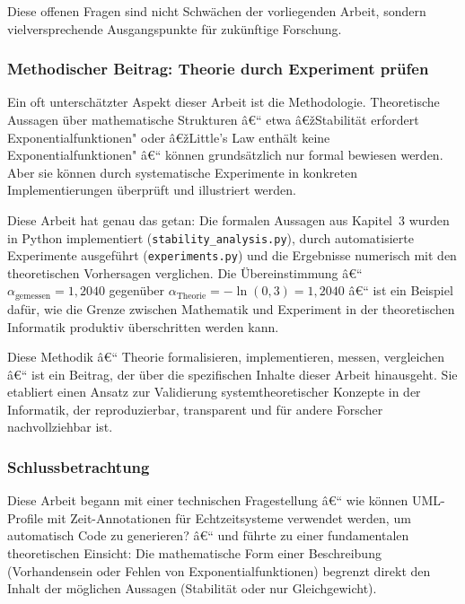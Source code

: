 ﻿\documentclass[a4paper,12pt]{scrreprt}
\theoremstyle{definition}
\begin{document}
Diese offenen Fragen sind nicht Schwächen der vorliegenden Arbeit, sondern
vielversprechende Ausgangspunkte für zukünftige Forschung.

\subsubsection{Methodischer Beitrag: Theorie durch Experiment prüfen}

Ein oft unterschätzter Aspekt dieser Arbeit ist die Methodologie.
Theoretische Aussagen über mathematische Strukturen â€“ etwa â€žStabilität
erfordert Exponentialfunktionen" oder â€žLittle's Law enthält keine
Exponentialfunktionen" â€“ können grundsätzlich nur formal bewiesen werden.
Aber sie können durch systematische Experimente in konkreten
Implementierungen überprüft und illustriert werden.

Diese Arbeit hat genau das getan: Die formalen Aussagen aus Kapitel~3 wurden
in Python implementiert (\texttt{stability\_analysis.py}), durch automatisierte
Experimente ausgeführt (\texttt{experiments.py}) und die Ergebnisse numerisch
mit den theoretischen Vorhersagen verglichen.  Die Übereinstimmung â€“
$\alpha_\text{gemessen} = 1{,}2040$ gegenüber $\alpha_\text{Theorie} =
-\ln(0{,}3) = 1{,}2040$ â€“ ist ein Beispiel dafür, wie die Grenze zwischen
Mathematik und Experiment in der theoretischen Informatik produktiv überschritten
werden kann.

Diese Methodik â€“ Theorie formalisieren, implementieren, messen, vergleichen â€“
ist ein Beitrag, der über die spezifischen Inhalte dieser Arbeit hinausgeht.
Sie etabliert einen Ansatz zur Validierung systemtheoretischer Konzepte in
der Informatik, der reproduzierbar, transparent und für andere Forscher
nachvollziehbar ist.

\subsubsection{Schlussbetrachtung}

Diese Arbeit begann mit einer technischen Fragestellung â€“ wie können
UML-Profile mit Zeit-Annotationen für Echtzeitsysteme verwendet werden,
um automatisch Code zu generieren? â€“ und führte zu einer fundamentalen
theoretischen Einsicht: Die mathematische Form einer Beschreibung
(Vorhandensein oder Fehlen von Exponentialfunktionen) begrenzt direkt
den Inhalt der möglichen Aussagen (Stabilität oder nur Gleichgewicht).
\end{document}

